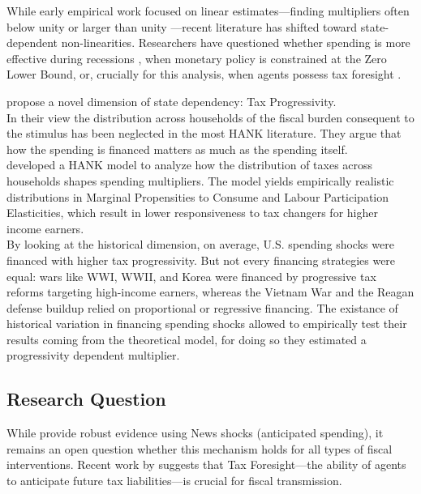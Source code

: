 \documentclass[12pt,letterpaper]{article}
\begin{document}
While early empirical work focused on linear estimates—finding multipliers often below unity \cite{RameyShapiro98, Ramey2011} or larger than unity \cite{BP}—recent literature has shifted toward state-dependent non-linearities. Researchers have questioned whether spending is more effective during recessions \citep{Auerbach_Gorodnichenko_2012_Measuring, CaggianoCastelnuovo_NonLinear, RameyZubairy2018}, when monetary policy is constrained at the Zero Lower Bound, or, crucially for this analysis, when agents possess tax foresight \citep{Ascari}.


\cite{FN} propose a novel dimension of state dependency: Tax Progressivity.
\\
In their view the distribution across households of the fiscal burden consequent to the stimulus has been neglected in the most HANK literature.
They argue that how the spending is financed matters as much as the spending itself. 
\\
\cite{FN} developed a HANK model to analyze how the distribution of taxes across households shapes spending multipliers.
The model yields empirically realistic distributions in Marginal Propensities to Consume and Labour Participation Elasticities, which result in lower responsiveness to tax changers for higher income earners.
\\
By looking at the historical dimension, on average, U.S. spending shocks were financed with higher tax progressivity.
But not every financing strategies were equal: wars like WWI, WWII, and Korea were financed by progressive tax reforms targeting high-income earners, whereas the Vietnam War and the Reagan defense buildup relied on proportional or regressive financing. The existance of historical variation in financing spending shocks allowed \cite{FN} to empirically test their results coming from the theoretical model, for doing so they estimated a progressivity dependent multiplier.



\subsection{Research Question}
While \cite{FN} provide robust evidence using News shocks (anticipated spending), it remains an open question whether this mechanism holds for all types of fiscal interventions. Recent work by \cite{Ascari} suggests that Tax Foresight—the ability of agents to anticipate future tax liabilities—is crucial for fiscal transmission.
\end{document}
